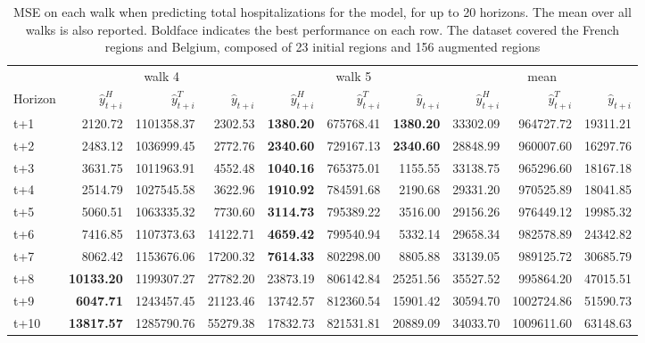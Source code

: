 \begin{table}[H]
\centering
\caption{MSE on each walk when predicting total hospitalizations for the model, for up to 20 horizons. The mean over all walks is also reported. Boldface indicates the best performance on each row. The dataset covered the French regions and Belgium, composed of 23 initial regions and 156 augmented regions }
\label{tab:MSE_walk_assemble}
\begin{tabular}{lrrrrrrrrr}
\toprule
 & \multicolumn{3}{c}{walk 4} & \multicolumn{3}{c}{walk 5} & \multicolumn{3}{c}{mean} 
\\

\cmidrule(lr){2-4} \cmidrule(lr){5-7} \cmidrule(lr){8-10} 
Horizon & $\hat{y}_{t+i}^H$ & $\hat{y}_{t+i}^T$ & $\hat{y}_{t+i}$ & $\hat{y}_{t+i}^H$ & $\hat{y}_{t+i}^T$ & $\hat{y}_{t+i}$ & $\hat{y}_{t+i}^H$ & $\hat{y}_{t+i}^T$ & $\hat{y}_{t+i}$ \\
\midrule
t+1  & 2120.72  & 1101358.37  & 2302.53  & \textbf{1380.20}  & 675768.41  & \textbf{1380.20}  & 33302.09  & 964727.72  & 19311.21  \\
t+2  & 2483.12  & 1036999.45  & 2772.76  & \textbf{2340.60}  & 729167.13  & \textbf{2340.60}  & 28848.99  & 960007.60  & 16297.76  \\
t+3  & 3631.75  & 1011963.91  & 4552.48  & \textbf{1040.16}  & 765375.01  & 1155.55  & 33138.75  & 965296.60  & 18167.18  \\
t+4  & 2514.79  & 1027545.58  & 3622.96  & \textbf{1910.92}  & 784591.68  & 2190.68  & 29331.20  & 970525.89  & 18041.85  \\
t+5  & 5060.51  & 1063335.32  & 7730.60  & \textbf{3114.73}  & 795389.22  & 3516.00  & 29156.26  & 976449.12  & 19985.32  \\
t+6  & 7416.85  & 1107373.63  & 14122.71  & \textbf{4659.42}  & 799540.94  & 5332.14  & 29658.34  & 982578.89  & 24342.82  \\
t+7  & 8062.42  & 1153676.06  & 17200.32  & \textbf{7614.33}  & 802298.00  & 8805.88  & 33139.05  & 989125.72  & 30685.79  \\
t+8  & \textbf{10133.20}  & 1199307.27  & 27782.20  & 23873.19  & 806142.84  & 25251.56  & 35527.52  & 995864.20  & 47015.51  \\
t+9  & \textbf{6047.71}  & 1243457.45  & 21123.46  & 13742.57  & 812360.54  & 15901.42  & 30594.70  & 1002724.86  & 51590.73  \\
t+10  & \textbf{13817.57}  & 1285790.76  & 55279.38  & 17832.73  & 821531.81  & 20889.09  & 34033.70  & 1009611.60  & 63148.63  \\

\end{tabular}
\end{table}
